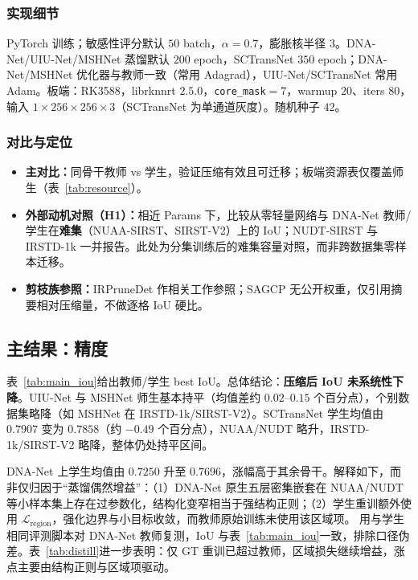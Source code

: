 \documentclass[lettersize,journal]{IEEEtran}
\begin{document}
\subsubsection{实现细节}
PyTorch 训练；敏感性评分默认 $50$ batch，$\alpha=0.7$，膨胀核半径 $3$。DNA-Net/UIU-Net/MSHNet 蒸馏默认 $200$ epoch，SCTransNet $350$ epoch；DNA-Net/MSHNet 优化器与教师一致（常用 Adagrad），UIU-Net/SCTransNet 常用 Adam。板端：RK3588，librknnrt $2.5.0$，\texttt{core\_mask}$=7$，warmup $20$、iters $80$，输入 $1\times256\times256\times3$（SCTransNet 为单通道灰度）。随机种子 $42$。

\subsubsection{对比与定位}
\begin{itemize}
\item \textbf{主对比：}同骨干教师 vs 学生，验证压缩有效且可迁移；板端资源表仅覆盖师生（表~\ref{tab:resource}）。
\item \textbf{外部动机对照（H1）：}相近 Params 下，比较从零轻量网络与 DNA-Net 教师/学生在\textbf{难集}（NUAA-SIRST、SIRST-V2）上的 IoU；NUDT-SIRST 与 IRSTD-1k 一并报告。此处为分集训练后的难集容量对照，而非跨数据集零样本迁移。
\item \textbf{剪枝族参照：}IRPruneDet\cite{IRPruneDet2024} 作相关工作参照；SAGCP\cite{SAGCP2025} 无公开权重，仅引用摘要相对压缩量，不做逐格 IoU 硬比。
\end{itemize}

\subsection{主结果：精度}
\label{sec:main_results}

表~\ref{tab:main_iou}给出教师/学生 best IoU。总体结论：\textbf{压缩后 IoU 未系统性下降}。UIU-Net 与 MSHNet 师生基本持平（均值差约 $0.02$--$0.15$ 个百分点），个别数据集略降（如 MSHNet 在 IRSTD-1k/SIRST-V2）。SCTransNet 学生均值由 $0.7907$ 变为 $0.7858$（约 $-0.49$ 个百分点），NUAA/NUDT 略升，IRSTD-1k/SIRST-V2 略降，整体仍处持平区间。

DNA-Net 上学生均值由 $0.7250$ 升至 $0.7696$，涨幅高于其余骨干。解释如下，而非仅归因于“蒸馏偶然增益”：（1）DNA-Net 原生五层密集嵌套在 NUAA/NUDT 等小样本集上存在过参数化，结构化变窄相当于强结构正则；（2）学生重训额外使用 $\mathcal{L}_{\mathrm{region}}$，强化边界与小目标收敛，而教师原始训练未使用该区域项。
用与学生相同评测脚本对 DNA-Net 教师复测，IoU 与表~\ref{tab:main_iou}一致，排除口径伪差。表~\ref{tab:distill}进一步表明：仅 GT 重训已超过教师，区域损失继续增益，涨点主要由结构正则与区域项驱动。
\end{document}
